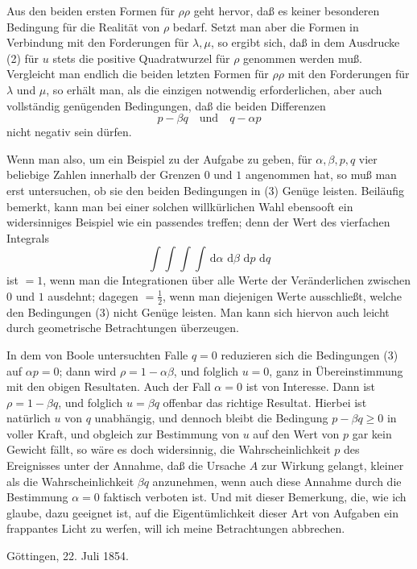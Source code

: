 \documentclass[11pt]{article}
\newcommand{\dd}{\,\mathrm d}
\newcommand{\datedline}[1]{\begin{flushright}#1\end{flushright}}
\begin{document}
Aus den beiden ersten Formen für $\rho\rho$ geht hervor, daß es keiner besonderen Bedingung für die Realität von $\rho$ bedarf. Setzt man aber die Formen in Verbindung mit den Forderungen für $\lambda,\mu$, so ergibt sich, daß in dem Ausdrucke (2) für $u$ stets die positive Quadratwurzel für $\rho$ genommen werden muß. Vergleicht man endlich die beiden letzten Formen für $\rho\rho$ mit den Forderungen für $\lambda$ und $\mu$, so erhält man, als die einzigen notwendig erforderlichen, aber auch vollständig genügenden Bedingungen, daß die beiden Differenzen
\begin{equation}
p-\beta q\quad\text{und}\quad q-\alpha p
\tag{3}
\end{equation}
nicht negativ sein dürfen.

Wenn man also, um ein Beispiel zu der Aufgabe zu geben, für $\alpha,\beta,p,q$ vier beliebige Zahlen innerhalb der Grenzen $0$ und $1$ angenommen hat, so muß man erst untersuchen, ob sie den beiden Bedingungen in (3) Genüge leisten. Beiläufig bemerkt, kann man bei einer solchen willkürlichen Wahl ebensooft ein widersinniges Beispiel wie ein passendes treffen; denn der Wert des vierfachen Integrals
\[
\int\!\int\!\int\!\int \dd\alpha\,\dd\beta\,\dd p\,\dd q
\]
ist $=1$, wenn man die Integrationen über alle Werte der Veränderlichen zwischen $0$ und $1$ ausdehnt; dagegen $=\frac12$, wenn man diejenigen Werte ausschließt, welche den Bedingungen (3) nicht Genüge leisten. Man kann sich hiervon auch leicht durch geometrische Betrachtungen überzeugen.

In dem von Boole untersuchten Falle $q=0$ reduzieren sich die Bedingungen (3) auf $\alpha p=0$; dann wird $\rho=1-\alpha\beta$, und folglich $u=0$, ganz in Übereinstimmung mit den obigen Resultaten. Auch der Fall $\alpha=0$ ist von Interesse. Dann ist $\rho=1-\beta q$, und folglich $u=\beta q$ offenbar das richtige Resultat. Hierbei ist natürlich $u$ von $q$ unabhängig, und dennoch bleibt die Bedingung $p-\beta q\ge0$ in voller Kraft, und obgleich zur Bestimmung von $u$ auf den Wert von $p$ gar kein Gewicht fällt, so wäre es doch widersinnig, die Wahrscheinlichkeit $p$ des Ereignisses unter der Annahme, daß die Ursache $A$ zur Wirkung gelangt, kleiner als die Wahrscheinlichkeit $\beta q$ anzunehmen, wenn auch diese Annahme durch die Bestimmung $\alpha=0$ faktisch verboten ist. Und mit dieser Bemerkung, die, wie ich glaube, dazu geeignet ist, auf die Eigentümlichkeit dieser Art von Aufgaben ein frappantes Licht zu werfen, will ich meine Betrachtungen abbrechen.

\datedline{Göttingen, 22. Juli 1854.}
\end{document}
